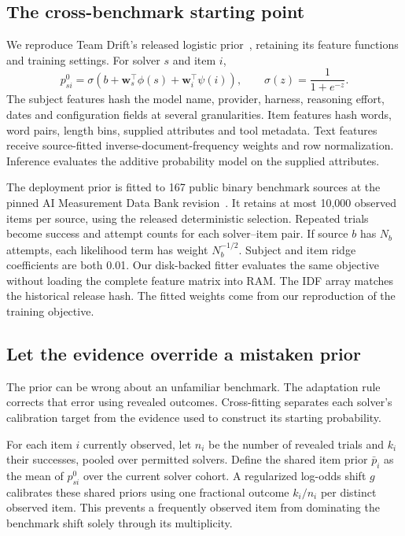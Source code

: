 \documentclass{article}
\begin{document}
\subsection{The cross-benchmark starting point}
We reproduce Team Drift's released logistic prior~\cite{drift}, retaining its feature functions and training settings. For solver $s$ and item $i$,
\begin{equation}
p^0_{si}=\sigma\!\left(b+\mathbf w_s^\top\phi(s)+\mathbf w_i^\top\psi(i)\right),\qquad \sigma(z)=\frac{1}{1+e^{-z}}.
\end{equation}
The subject features hash the model name, provider, harness, reasoning effort, dates and configuration fields at several granularities. Item features hash words, word pairs, length bins, supplied attributes and tool metadata. Text features receive source-fitted inverse-document-frequency weights and row normalization. Inference evaluates the additive probability model on the supplied attributes.

The deployment prior is fitted to 167 public binary benchmark sources at the pinned AI Measurement Data Bank revision~\cite{db}. It retains at most 10,000 observed items per source, using the released deterministic selection. Repeated trials become success and attempt counts for each solver--item pair. If source $b$ has $N_b$ attempts, each likelihood term has weight $N_b^{-1/2}$. Subject and item ridge coefficients are both 0.01. Our disk-backed fitter evaluates the same objective without loading the complete feature matrix into RAM. The IDF array matches the historical release hash. The fitted weights come from our reproduction of the training objective.

\subsection{Let the evidence override a mistaken prior}
The prior can be wrong about an unfamiliar benchmark. The adaptation rule corrects that error using revealed outcomes. Cross-fitting separates each solver's calibration target from the evidence used to construct its starting probability.

For each item $i$ currently observed, let $n_i$ be the number of revealed trials and $k_i$ their successes, pooled over permitted solvers. Define the shared item prior $\bar p_i$ as the mean of $p^0_{si}$ over the current solver cohort. A regularized log-odds shift $g$ calibrates these shared priors using one fractional outcome $k_i/n_i$ per distinct observed item. This prevents a frequently observed item from dominating the benchmark shift solely through its multiplicity.
\end{document}
